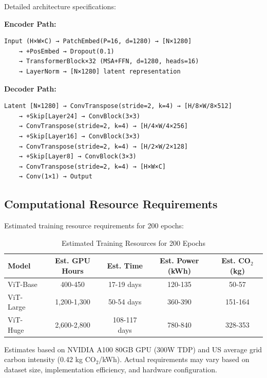 \documentclass[12pt,a4paper]{article}
\begin{document}
Detailed architecture specifications:

\textbf{Encoder Path:}
\begin{verbatim}
Input (H×W×C) → PatchEmbed(P=16, d=1280) → [N×1280]
    → +PosEmbed → Dropout(0.1)
    → TransformerBlock×32 (MSA+FFN, d=1280, heads=16)
    → LayerNorm → [N×1280] latent representation
\end{verbatim}

\textbf{Decoder Path:}
\begin{verbatim}
Latent [N×1280] → ConvTranspose(stride=2, k=4) → [H/8×W/8×512]
    → +Skip[Layer24] → ConvBlock(3×3)
    → ConvTranspose(stride=2, k=4) → [H/4×W/4×256]
    → +Skip[Layer16] → ConvBlock(3×3)
    → ConvTranspose(stride=2, k=4) → [H/2×W/2×128]
    → +Skip[Layer8] → ConvBlock(3×3)
    → ConvTranspose(stride=2, k=4) → [H×W×C]
    → Conv(1×1) → Output
\end{verbatim}

\subsection{Computational Resource Requirements}

Estimated training resource requirements for 200 epochs:

\begin{table}[H]
\centering
\caption{Estimated Training Resources for 200 Epochs}
\begin{tabular}{lcccc}
\toprule
\textbf{Model} & \textbf{Est. GPU Hours} & \textbf{Est. Time} & \textbf{Est. Power (kWh)} & \textbf{Est. CO$_2$ (kg)} \\
\midrule
ViT-Base & 400-450 & 17-19 days & 120-135 & 50-57 \\
ViT-Large & 1,200-1,300 & 50-54 days & 360-390 & 151-164 \\
ViT-Huge & 2,600-2,800 & 108-117 days & 780-840 & 328-353 \\
\bottomrule
\end{tabular}
\end{table}

Estimates based on NVIDIA A100 80GB GPU (300W TDP) and US average grid carbon intensity (0.42 kg CO$_2$/kWh). Actual requirements may vary based on dataset size, implementation efficiency, and hardware configuration.
\end{document}
